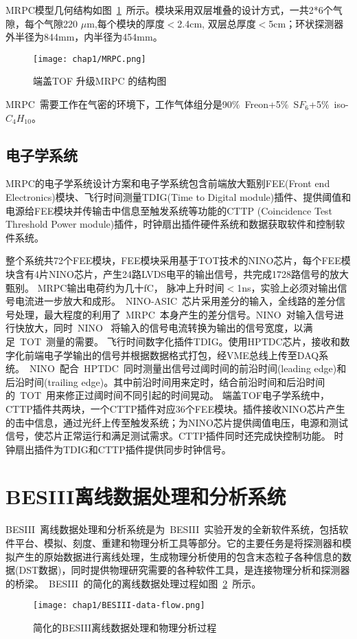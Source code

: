 MRPC模型几何结构如图~\ref{fig:MRPC}~所示。模块采用双层堆叠的设计方式，一共2*6个气隙，每个气隙220 $\mu$m,每个模块的厚度$<$2.4cm, 双层总厚度$<$5cm；环状探测器外半径为844mm，内半径为454mm。
\begin{figure}[!h]
  \centering
  \texttt{[image: chap1/MRPC.png]}
  \caption{端盖TOF 升级MRPC 的结构图}
  \label{fig:MRPC}
\end{figure}

MRPC~需要工作在气密的环境下，工作气体组分是90$\%$~Freon+5$\%$~S$F_{6}$+5$\%$~iso-$C_{4}H_{10}$。
\subsection{电子学系统}

MRPC的电子学系统设计方案和电子学系统包含前端放大甄别FEE(Front end Electronics)模块、飞行时间测量TDIG(Time to Digital module)插件、提供阈值和电源给FEE模块并传输击中信息至触发系统等功能的CTTP (Coincidence Test Threshold Power module)插件，时钟扇出插件硬件系统和数据获取软件和控制软件系统。

整个系统共72个FEE模块，FEE模块采用基于TOT技术的NINO芯片，每个FEE模块含有4片NINO芯片，产生24路LVDS电平的输出信号，共完成1728路信号的放大甄别。
MRPC输出电荷约为几十fC， 脉冲上升时间$<$1ns，实验上必须对输出信号电流进一步放大和成形。~NINO-ASIC~芯片采用差分的输入，全线路的差分信号处理，最大程度的利用了~MRPC~本身产生的差分信号。NINO~对输入信号进行快放大，同时~NINO~ 将输入的信号电流转换为输出的信号宽度，以满足~TOT~测量的需要。
飞行时间数字化插件TDIG。使用HPTDC芯片，接收和数字化前端电子学输出的信号并根据数据格式打包，经VME总线上传至DAQ系统。~NINO~配合~HPTDC~同时测量出信号过阈时间的前沿时间(leading edge)和后沿时间(trailing edge)。其中前沿时间用来定时，结合前沿时间和后沿时间的~TOT~用来修正过阈时间不同引起的时间晃动。
端盖TOF电子学系统中，CTTP插件共两块，一个CTTP插件对应36个FEE模块。插件接收NINO芯片产生的击中信息，通过光纤上传至触发系统；为NINO芯片提供阈值电压，电源和测试信号，使芯片正常运行和满足测试需求。CTTP插件同时还完成快控制功能。
时钟扇出插件为TDIG和CTTP插件提供同步时钟信号。

\section{BESIII离线数据处理和分析系统}
BESIII~离线数据处理和分析系统是为~BESIII~实验开发的全新软件系统，包括软件平台、模拟、刻度、重建和物理分析工具等部分。它的主要任务是将探测器和模拟产生的原始数据进行离线处理，生成物理分析使用的包含末态粒子各种信息的数据(DST数据)，同时提供物理研究需要的各种软件工具，是连接物理分析和探测器的桥梁。~BESIII~的简化的离线数据处理过程如图~\ref{fig:BESIII-data-flow}~所示。
\begin{figure}[!h]
  \centering
  \texttt{[image: chap1/BESIII-data-flow.png]}
  \caption{简化的BESIII离线数据处理和物理分析过程}
  \label{fig:BESIII-data-flow}
\end{figure}


